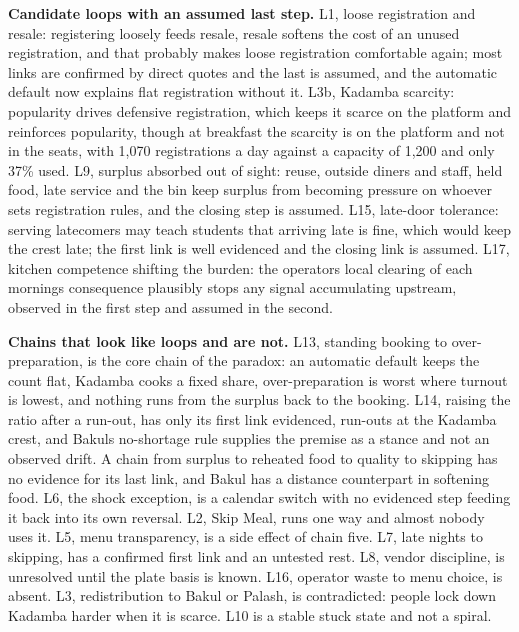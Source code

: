 \documentclass[
  10pt,
  table]{article}
\begin{document}
\textbf{Candidate loops with an assumed last step.} L1, loose registration and resale: registering loosely feeds resale, resale softens the cost of an unused registration, and that probably makes loose registration comfortable again; most links are confirmed by direct quotes and the last is assumed, and the automatic default now explains flat registration without it. L3b, Kadamba scarcity: popularity drives defensive registration, which keeps it scarce on the platform and reinforces popularity, though at breakfast the scarcity is on the platform and not in the seats, with 1,070 registrations a day against a capacity of 1,200 and only 37\% used. L9, surplus absorbed out of sight: reuse, outside diners and staff, held food, late service and the bin keep surplus from becoming pressure on whoever sets registration rules, and the closing step is assumed. L15, late-door tolerance: serving latecomers may teach students that arriving late is fine, which would keep the crest late; the first link is well evidenced and the closing link is assumed. L17, kitchen competence shifting the burden: the operators\textquotesingle{} local clearing of each morning\textquotesingle s consequence plausibly stops any signal accumulating upstream, observed in the first step and assumed in the second.

\textbf{Chains that look like loops and are not.} L13, standing booking to over-preparation, is the core chain of the paradox: an automatic default keeps the count flat, Kadamba cooks a fixed share, over-preparation is worst where turnout is lowest, and nothing runs from the surplus back to the booking. L14, raising the ratio after a run-out, has only its first link evidenced, run-outs at the Kadamba crest, and Bakul\textquotesingle s no-shortage rule supplies the premise as a stance and not an observed drift. A chain from surplus to reheated food to quality to skipping has no evidence for its last link, and Bakul has a distance counterpart in softening food. L6, the shock exception, is a calendar switch with no evidenced step feeding it back into its own reversal. L2, Skip Meal, runs one way and almost nobody uses it. L5, menu transparency, is a side effect of chain five. L7, late nights to skipping, has a confirmed first link and an untested rest. L8, vendor discipline, is unresolved until the plate basis is known. L16, operator waste to menu choice, is absent. L3, redistribution to Bakul or Palash, is contradicted: people lock down Kadamba harder when it is scarce. L10 is a stable stuck state and not a spiral.
\end{document}
